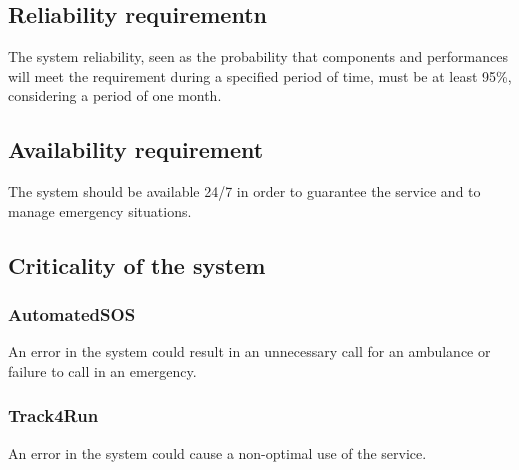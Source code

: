 \subsection{Reliability requirementn}
The system reliability, seen as the probability that components and performances will meet the requirement during a specified period of time, must be at least 95\%, considering a period of one month.

\subsection{Availability requirement}
The system should be available 24/7 in order to guarantee the service and to manage emergency situations.

\subsection{Criticality of the system}
\subsubsection{AutomatedSOS}
An error in the system could result in an unnecessary call for an ambulance or failure to call in an emergency.
\subsubsection{Track4Run}
An error in the system could cause a non-optimal use of the service.

